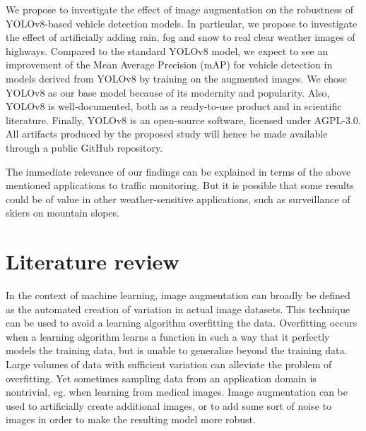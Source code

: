 \documentclass[]{article}
\begin{document}
	We propose to investigate the effect of image augmentation on the robustness of YOLO{\small v8}-based vehicle detection models. In particular, we propose to investigate the effect of artificially adding rain, fog and snow to real clear weather images of highways. Compared to the standard YOLO{\small v8} model, we expect to see an improvement of the Mean Average Precision (mAP) for vehicle detection in models derived from YOLO{\small v8} by training on the augmented images. We chose YOLO{\small v8} as our base model because of its modernity and popularity. Also, YOLO{\small v8} is well-documented, both as a ready-to-use product and in scientific literature. Finally, YOLO{\small v8} is an open-source software, licensed under AGPL-3.0. All artifacts produced by the proposed study will hence be made available through a public GitHub repository.  
	
	The immediate relevance of our findings can be explained in terms of the above mentioned applications to traffic monitoring. But it is possible that some results could be of value in other weather-sensitive applications, such as surveillance of skiers on mountain slopes.

\section{Literature review}

	In the context of machine learning, image augmentation can broadly be defined as the automated creation of variation in actual image datasets. This technique can be used to avoid a learning algorithm overfitting the data. Overfitting occurs when a learning algorithm learns a function in such a way that it perfectly models the training data, but is unable to generalize beyond the training data. Large volumes of data with sufficient variation can alleviate the problem of overfitting. Yet sometimes sampling data from an application domain is nontrivial, eg. when learning from medical images.  Image augmentation can be used to artificially create additional images, or to add some sort of noise to images in order to make the resulting model more robust.
	
\end{document}
